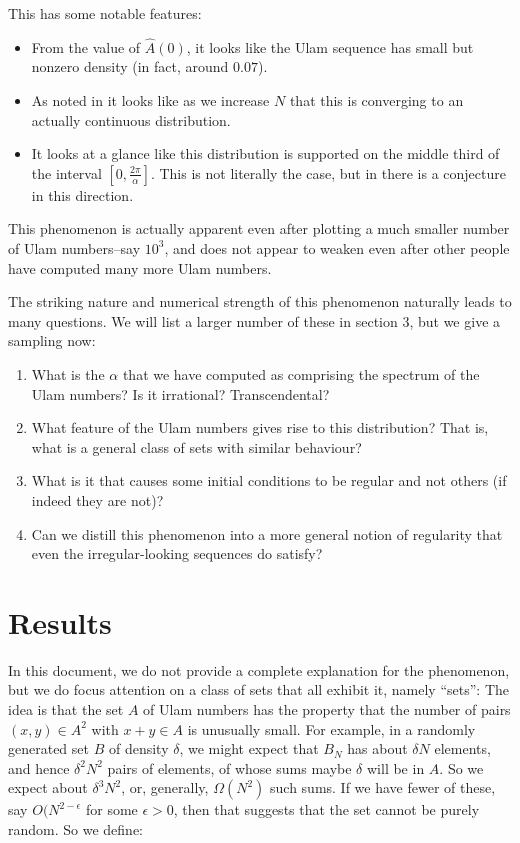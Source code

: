 \documentclass{report}
\theoremstyle{remark}
\numberwithin{equation}{section}
\begin{document}
This has some notable features: 

\begin{itemize}
\item From the value of $\widehat{A}(0)$, it looks like the Ulam
  sequence has small but nonzero density (in fact, around $0.07$).

\item As noted in \cite{steinerberger:preprint} it looks like as we increase $N$
  that this is converging to an actually continuous distribution.

\item It looks at a glance like this distribution is supported on the
  middle third of the interval $[0,\frac{2\pi}\alpha]$.  This is not
  literally the case, but in \cite{gibbs:preprint} there is a
  conjecture in this direction.
\end{itemize}

This phenomenon is actually apparent even after plotting a much
smaller number of Ulam numbers--say $10^3$, and does not appear to
weaken even after other people have computed many more Ulam numbers.

The striking nature and numerical strength of this phenomenon
naturally leads to many questions.  We will list a larger number of
these in section 3, but we give a sampling now: 

\begin{enumerate}
\item What is the $\alpha$ that we have computed as comprising the
  spectrum of the Ulam numbers?  Is it irrational?  Transcendental?

\item What feature of the Ulam numbers gives rise to this
  distribution?  That is, what is a general class of sets with similar
  behaviour?

\item What is it that causes some initial conditions to be regular and
  not others (if indeed they are not)?

\item Can we distill this phenomenon into a more general notion of
  regularity that even the irregular-looking sequences do satisfy?
\end{enumerate}

\section{Results}

In this document, we do not provide a complete explanation for the
phenomenon, but we do focus attention on a class of sets that all
exhibit it, namely ``\relevant sets'': The idea is that the set $A$ of
Ulam numbers has the property that the number of pairs
$(x, y) \in A^2$ with $x + y \in A$ is unusually small.  For example,
in a randomly generated set $B$ of density $\delta$, we might expect
that $B_N$ has about $\delta N$ elements, and hence $\delta^2 N^2$
pairs of elements, of whose sums maybe $\delta$ will be in $A$.  So we
expect about $\delta^3 N^2$, or, generally, $\Omega(N^2)$ such sums.
If we have fewer of these, say $O(N^{2-\epsilon}$ for some
$\epsilon > 0$, then that suggests that the set cannot be purely
random.  So we define: 
\end{document}
